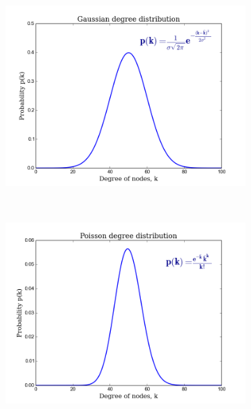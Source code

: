 \documentclass[10pt,a4paper]{article}
\begin{document}
\begin{figure}[H]
	\centering
	\begin{subfigure}[b]{0.45\textwidth}
		\includegraphics[width=\textwidth]{images/gaussian.png}
		\caption{}
		\label{gauss}
	\end{subfigure}~ 
	\begin{subfigure}[b]{0.45\textwidth}
		\includegraphics[width=\textwidth]{images/pois.png}
		\caption{}
		\label{poss}
	\end{subfigure} \\   
	\begin{subfigure}[b]{0.45\textwidth}

\end{subfigure}
\end{figure}
\end{document}
